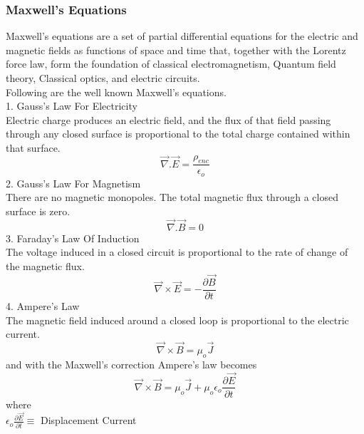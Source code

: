 \subsubsection{Maxwell's Equations}
Maxwell’s equations are a set of partial differential equations for the electric and magnetic fields as functions of space and time that, together with the Lorentz force law, form the foundation of classical electromagnetism, Quantum field theory, Classical optics, and electric circuits.\\ 
Following are the well known Maxwell's equations.\\
1. Gauss’s Law For Electricity\\
Electric charge produces an electric field, and the flux of that field passing through any closed surface is proportional to the total charge contained within that surface.\\
\begin{equation}
\vec{\nabla}.\vec{E} = \frac{\rho_{enc}}{\epsilon_{o}}
\end{equation}
2. Gauss’s Law For Magnetism\\
There are no magnetic monopoles. The total magnetic flux through a closed surface is zero.\\
\begin{equation}
\vec{\nabla}.\vec{B} = 0
\end{equation}
3. Faraday’s Law Of Induction\\
The voltage induced in a closed circuit is proportional to the rate of change of the magnetic flux.\\
\begin{equation}
\vec{\nabla}\times\vec{E} = - \frac{\partial\vec{B}}{\partial t}
\end{equation}
4. Ampere’s Law\\
The magnetic field induced around a closed loop is proportional to the electric current.\\
\begin{equation}
\vec{\nabla}\times\vec{B} =\mu_{o}\vec{J}
\end{equation}
and with the Maxwell's correction Ampere's law becomes\\
\begin{equation}
\vec{\nabla}\times\vec{B} =\mu_{o}\vec{J}+\mu_{o}\epsilon_{o}\frac{\partial\vec{E}}{\partial t}
\end{equation}
where\\

$\epsilon_{o}\frac{\partial\vec{E}}{\partial t}\equiv$ Displacement Current

